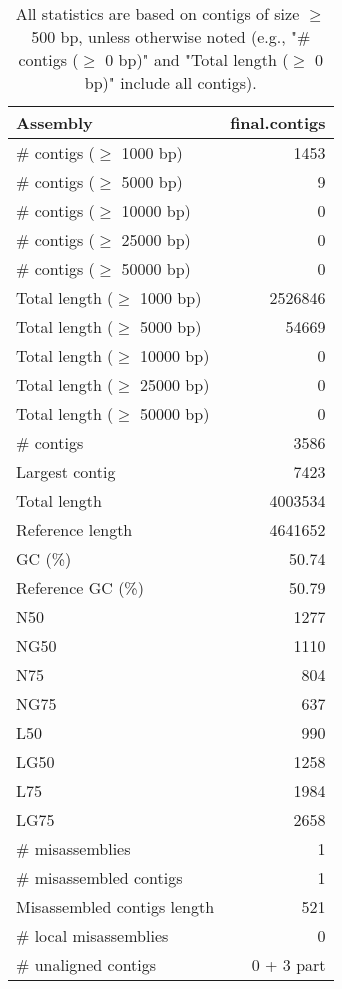 \documentclass[12pt,a4paper]{article}
\begin{document}
\begin{table}[ht]
\begin{center}
\caption{All statistics are based on contigs of size $\geq$ 500 bp, unless otherwise noted (e.g., "\# contigs ($\geq$ 0 bp)" and "Total length ($\geq$ 0 bp)" include all contigs).}
\begin{tabular}{|l*{1}{|r}|}
\hline
Assembly & final.contigs \\ \hline
\# contigs ($\geq$ 1000 bp) & 1453 \\ \hline
\# contigs ($\geq$ 5000 bp) & 9 \\ \hline
\# contigs ($\geq$ 10000 bp) & 0 \\ \hline
\# contigs ($\geq$ 25000 bp) & 0 \\ \hline
\# contigs ($\geq$ 50000 bp) & 0 \\ \hline
Total length ($\geq$ 1000 bp) & 2526846 \\ \hline
Total length ($\geq$ 5000 bp) & 54669 \\ \hline
Total length ($\geq$ 10000 bp) & 0 \\ \hline
Total length ($\geq$ 25000 bp) & 0 \\ \hline
Total length ($\geq$ 50000 bp) & 0 \\ \hline
\# contigs & 3586 \\ \hline
Largest contig & 7423 \\ \hline
Total length & 4003534 \\ \hline
Reference length & 4641652 \\ \hline
GC (\%) & 50.74 \\ \hline
Reference GC (\%) & 50.79 \\ \hline
N50 & 1277 \\ \hline
NG50 & 1110 \\ \hline
N75 & 804 \\ \hline
NG75 & 637 \\ \hline
L50 & 990 \\ \hline
LG50 & 1258 \\ \hline
L75 & 1984 \\ \hline
LG75 & 2658 \\ \hline
\# misassemblies & 1 \\ \hline
\# misassembled contigs & 1 \\ \hline
Misassembled contigs length & 521 \\ \hline
\# local misassemblies & 0 \\ \hline
\# unaligned contigs & 0 + 3 part \\ \hline

\end{tabular}
\end{center}
\end{table}
\end{document}

